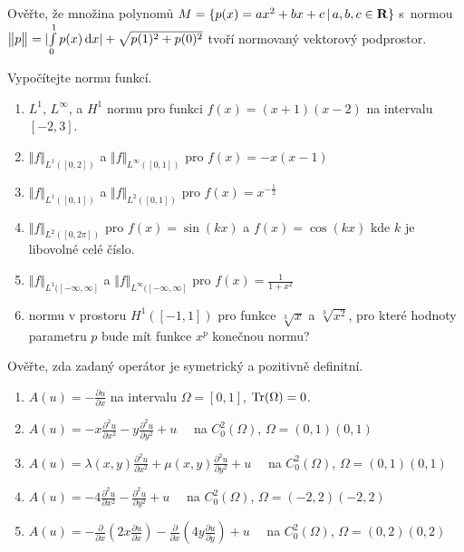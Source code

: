 \documentclass[a4paper,10pt]{book}
\def\Tr{{\rm Tr}}
\def\Real{{\rm\bf R}}
\def\d{\,{\rm d}}               %
\def\abs#1{\lvert#1\rvert}
\def\norm#1{\bigl\Vert#1\bigr\Vert} %
\def\where{\,|\,}                    %
\begin{document}
\exercise \label{ex:norm6} Ověřte, že množina polynomů $M = \{p(x)=ax^2+bx+c \where a,b,c \in \Real\}$ s~normou 
  $\norm{p}=\abs{\int \limits_0^1 p(x) \d x} + \sqrt{p(1)^2 + p(0)^2}$ tvoří normovaný vektorový podprostor.

\exercise \label{ex:norm7} Vypočítejte normu funkcí. 
\begin{enumerate}[label={\alph*)},itemsep=-2pt, topsep=-7pt]
         \item $L^1$, $L^\infty$, a $H^1$ normu pro funkci $f(x)=(x+1)(x-2)$ na intervalu $[-2,3]$.
         \item $\norm{f}_{L^1([0,2])}$ a $\norm{f}_{L^\infty([0,1])}$ pro $f(x)=-x(x-1)$
         \item $\norm{f}_{L^1([0,1])}$ a $\norm{f}_{L^2([0,1])}$ pro $f(x)=x^{-\frac12}$
         \item $\norm{f}_{L^2([0,2\pi])}$ pro $f(x) =\sin(kx)$ a $f(x)=\cos(kx)$ kde $k$ je libovolné celé číslo.
         \item $\norm{f}_{L^1([-\infty,\infty]}$ a $\norm{f}_{L^\infty([-\infty,\infty]}$  pro $f(x)=\frac{1}{1+x^2}$
         \item normu v prostoru $H^1([-1,1])$ pro funkce $\sqrt[3]{x}$ a $\sqrt[3]{x^2}$, pro které hodnoty parametru
                $p$ bude mít funkce $x^p$ konečnou normu?
\end{enumerate}
  
\exercise \label{ex:op1} Ověřte, zda zadaný operátor je symetrický a pozitivně definitní. \\
\begin{enumerate}[label=\alph*), itemsep=-3pt, topsep=-7pt]
\item $A(u)=-\frac{\partial u}{\partial x}$ na intervalu $\Omega=[0,1]$, $\Tr(\Omega)=0$.
\item $A(u)=-x\frac{\partial^2 u}{\partial x^2}-y \frac{\partial^2 u}{\partial y^2} + u \quad$ na $C^2_0(\Omega)$, $\Omega=(0,1)(0,1)$
\item $A(u)=\lambda(x,y)\frac{\partial^2 u}{\partial x^2} + \mu(x,y) \frac{\partial^2u}{\partial y^2} + u \quad$ na $C^2_0(\Omega)$, $\Omega=(0,1)(0,1)$
\item $A(u)=-4\frac{\partial^2 u}{\partial x^2}-\frac{\partial^2 u}{\partial y^2} + u \quad$ na $C^2_0(\Omega)$, $\Omega=(-2,2)(-2,2)$
\item $A(u)=-\frac{\partial}{\partial x}\left(2x\frac{\partial u}{\partial x}\right) 
            - \frac{\partial}{\partial x}\left(4y\frac{\partial u}{\partial y}\right) + u \quad$ na $C^2_0(\Omega)$, $\Omega=(0,2)(0,2)$
\end{enumerate}  
\end{document}
